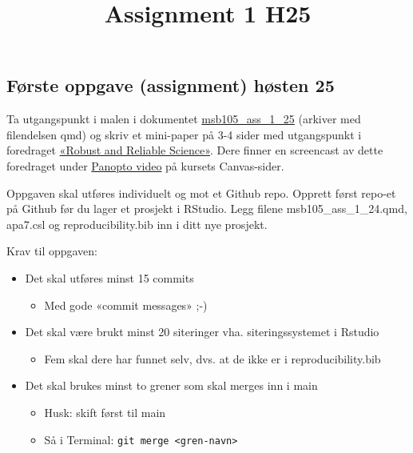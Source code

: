 \documentclass[
  a4paper,
  DIV=11,
  numbers=noendperiod]{scrartcl}
\title{Assignment 1 H25}
\author{}
\date{}
\providecommand{\tightlist}{%
  \setlength{\itemsep}{0pt}\setlength{\parskip}{0pt}}\usepackage{longtable,booktabs,array}
\begin{document}
\maketitle


\subsection{Første oppgave (assignment) høsten
25}\label{fuxf8rste-oppgave-assignment-huxf8sten-25}

Ta utgangspunkt i malen i dokumentet
\href{./msb105_ass_1_25.txt}{msb105\_ass\_1\_25} (arkiver med
filendelsen qmd) og skriv et mini-paper på 3-4 sider med utgangspunkt i
foredraget
\href{https://msb105.netlify.app/introduction/reproducibility/rr-science_h25\#/title-slide}{«Robust
and Reliable Science»}. Dere finner en screencast av dette foredraget
under
\href{https://hvl.instructure.com/courses/32799/external_tools/1650}{Panopto
video} på kursets Canvas-sider.

Oppgaven skal utføres individuelt og mot et Github repo. Opprett først
repo-et på Github før du lager et prosjekt i RStudio. Legg filene
msb105\_ass\_1\_24.qmd, apa7.csl og reproducibility.bib inn i ditt nye
prosjekt.

Krav til oppgaven:

\begin{itemize}
\tightlist
\item
  Det skal utføres minst 15 commits

  \begin{itemize}
  \tightlist
  \item
    Med gode «commit messages» ;-)
  \end{itemize}
\item
  Det skal være brukt minst 20 siteringer vha. siteringssystemet i
  Rstudio

  \begin{itemize}
  \tightlist
  \item
    Fem skal dere har funnet selv, dvs. at de ikke er i
    reproducibility.bib
  \end{itemize}
\item
  Det skal brukes minst to grener som skal merges inn i main

  \begin{itemize}
  \tightlist
  \item
    Husk: skift først til main
  \item
    Så i Terminal:
    \texttt{git\ merge\ \textless{}gren-navn\textgreater{}}
  \end{itemize}
\end{itemize}
\end{document}
